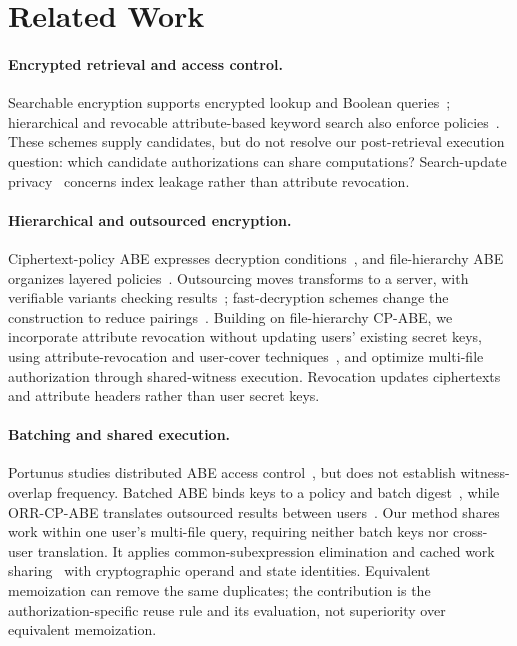 \documentclass[runningheads]{llncs}
\newif\ifmarkrevisions
\newenvironment{revision}{\par\begingroup\ifmarkrevisions\color{RevisionBlue}\fi}{\par\endgroup}
\begin{document}
\section{Related Work}
\begin{revision}
\paragraph{Encrypted retrieval and access control.}
Searchable encryption supports encrypted lookup and Boolean
queries~\cite{Song2000EncryptedSearch,Curtmola2006SSE,Cash2013BooleanSSE};
hierarchical and revocable attribute-based keyword search also enforce
policies~\cite{Miao2020ABKSHD,Cui2018AKSER}. These schemes supply candidates,
but do not resolve our post-retrieval execution question: which candidate
authorizations can share computations? Search-update
privacy~\cite{Bost2017ForwardBackward} concerns index leakage rather than
attribute revocation.

\paragraph{Hierarchical and outsourced encryption.}
Ciphertext-policy ABE expresses decryption
conditions~\cite{Bethencourt2007CPABE,Waters2011CPABE}, and file-hierarchy ABE
organizes layered policies~\cite{Wang2016FileHierarchy}. Outsourcing moves
transforms to a server, with verifiable variants checking
results~\cite{Green2011OutsourcedABE,Lai2013Verifiable}; fast-decryption
schemes change the construction to reduce
pairings~\cite{Hohenberger2013Fast}. Building on file-hierarchy CP-ABE, we
incorporate attribute revocation without updating users' existing secret
keys, using attribute-revocation and user-cover
techniques~\cite{Yu2010AttributeRevocation,Naor2001Cover}, and optimize
multi-file authorization through shared-witness execution. Revocation
updates ciphertexts and attribute headers rather than user secret keys.

\paragraph{Batching and shared execution.}
Portunus studies distributed ABE access control~\cite{Ladd2023Portunus}, but
does not establish witness-overlap frequency. Batched ABE binds keys to a
policy and batch digest~\cite{Sarkar2026BatchedABE}, while ORR-CP-ABE translates
outsourced results between users~\cite{Tao2024ORR}. Our method shares work
within one user's multi-file query, requiring neither batch keys nor cross-user
translation. It applies common-subexpression elimination and cached work
sharing~\cite{Roy2000MultiQuery,Michiardi2021CacheMQO} with cryptographic
operand and state identities. Equivalent memoization can remove the same
duplicates; the contribution is the authorization-specific reuse rule and
its evaluation, not superiority over equivalent memoization.
\end{revision}
\end{document}
